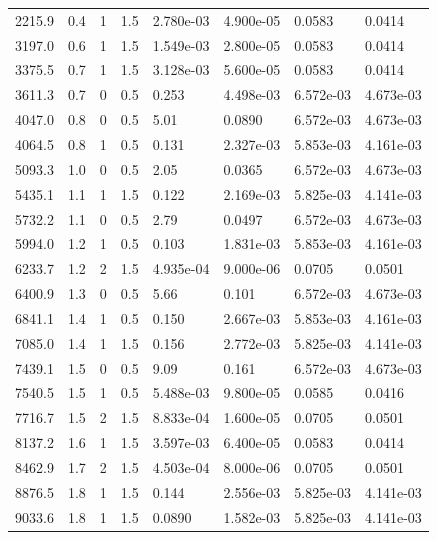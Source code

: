 \documentclass[preview]{standalone}
\begin{document}
{{\begin{tabular}{L{1.2cm}C{1.2cm} C{0.3cm}C{0.5cm} C{1.4cm}C{1.4cm} C{1.4cm}C{1.4cm}}
  2215.9  &   0.4  & 1     & 1.5 &  2.780e-03  & 4.900e-05  & 0.0583 &  0.0414   \\ 
  3197.0  &   0.6  & 1     & 1.5 &  1.549e-03  & 2.800e-05  & 0.0583 &  0.0414   \\ 
  3375.5  &   0.7  & 1     & 1.5 &  3.128e-03  & 5.600e-05  & 0.0583 &  0.0414   \\ 
  3611.3  &   0.7  & 0     & 0.5 &  0.253  & 4.498e-03  & 6.572e-03 &  4.673e-03   \\ 
  4047.0  &   0.8  & 0     & 0.5 &  5.01  & 0.0890  & 6.572e-03 &  4.673e-03   \\ 
  4064.5  &   0.8  & 1     & 0.5 &  0.131  & 2.327e-03  & 5.853e-03 &  4.161e-03   \\ 
  5093.3  &   1.0  & 0     & 0.5 &  2.05  & 0.0365  & 6.572e-03 &  4.673e-03   \\ 
  5435.1  &   1.1  & 1     & 1.5 &  0.122  & 2.169e-03  & 5.825e-03 &  4.141e-03   \\ 
  5732.2  &   1.1  & 0     & 0.5 &  2.79  & 0.0497  & 6.572e-03 &  4.673e-03   \\ 
  5994.0  &   1.2  & 1     & 0.5 &  0.103  & 1.831e-03  & 5.853e-03 &  4.161e-03   \\ 
  6233.7  &   1.2  & 2     & 1.5 &  4.935e-04  & 9.000e-06  & 0.0705 &  0.0501   \\ 
  6400.9  &   1.3  & 0     & 0.5 &  5.66  & 0.101  & 6.572e-03 &  4.673e-03   \\ 
  6841.1  &   1.4  & 1     & 0.5 &  0.150  & 2.667e-03  & 5.853e-03 &  4.161e-03   \\ 
  7085.0  &   1.4  & 1     & 1.5 &  0.156  & 2.772e-03  & 5.825e-03 &  4.141e-03   \\ 
  7439.1  &   1.5  & 0     & 0.5 &  9.09  & 0.161  & 6.572e-03 &  4.673e-03   \\ 
  7540.5  &   1.5  & 1     & 0.5 &  5.488e-03  & 9.800e-05  & 0.0585 &  0.0416   \\ 
  7716.7  &   1.5  & 2     & 1.5 &  8.833e-04  & 1.600e-05  & 0.0705 &  0.0501   \\ 
  8137.2  &   1.6  & 1     & 1.5 &  3.597e-03  & 6.400e-05  & 0.0583 &  0.0414   \\ 
  8462.9  &   1.7  & 2     & 1.5 &  4.503e-04  & 8.000e-06  & 0.0705 &  0.0501   \\ 
  8876.5  &   1.8  & 1     & 1.5 &  0.144  & 2.556e-03  & 5.825e-03 &  4.141e-03   \\ 
  9033.6  &   1.8  & 1     & 1.5 &  0.0890  & 1.582e-03  & 5.825e-03 &  4.141e-03   \\ 

\end{tabular}}}
\end{document}
